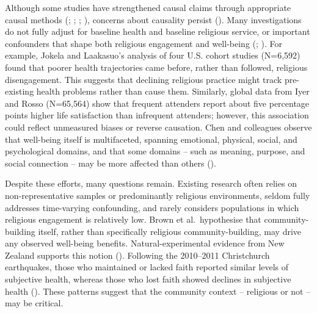 \documentclass[
  single column]{article}
\begin{document}
Although some studies have strengthened causal claims through
appropriate causal methods (; ;
; ), concerns about causality persist
().
Many investigations do not fully adjust for baseline health and baseline
religious service, or important confounders that shape both religious
engagement and well-being (; ). For example, Jokela and Laakasuo's analysis of four
U.S. cohort studies (N=6,592) found that poorer health trajectories came
before, rather than followed, religious disengagement. This suggests
that declining religious practice might track pre-existing health
problems rather than cause them. Similarly, global data from Iyer and
Rosso (N=65,564) show that frequent attenders report about five
percentage points higher life satisfaction than infrequent attenders;
however, this association could reflect unmeasured biases or reverse
causation. Chen and colleagues observe that well-being itself is
multifaceted, spanning emotional, physical, social, and psychological
domains, and that some domains -- such as meaning, purpose, and social
connection -- may be more affected than others
().

Despite these efforts, many questions remain. Existing research often
relies on non-representative samples or predominantly religious
environments, seldom fully addresses time-varying confounding, and
rarely considers populations in which religious engagement is relatively
low. Brown et al.~hypothesise that community-building itself, rather
than specifically religious community-building, may drive any observed
well-being benefits. Natural-experimental evidence from New Zealand
supports this notion (). Following the 2010--2011 Christchurch earthquakes, those
who maintained or lacked faith reported similar levels of subjective
health, whereas those who lost faith showed declines in subjective
health (). These
patterns suggest that the community context -- religious or not -- may
be critical.
\end{document}
